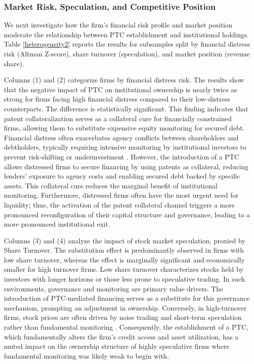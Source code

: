 \documentclass[12pt,a4paper]{article}
\begin{document}
\subsubsection{Market Risk, Speculation, and Competitive Position}
We next investigate how the firm's financial risk profile and market position moderate the relationship between PTC establishment and institutional holdings. Table \ref{heterogeneity2} reports the results for subsamples split by financial distress risk (Altman Z-score), share turnover (speculation), and market position (revenue share).

Columns (1) and (2) categorize firms by financial distress risk. The results show that the negative impact of PTC on institutional ownership is nearly twice as strong for firms facing high financial distress compared to their low-distress counterparts. The difference is statistically significant. This finding indicates that patent collateralization serves as a collateral cure for financially constrained firms, allowing them to substitute expensive equity monitoring for secured debt. Financial distress often exacerbates agency conflicts between shareholders and debtholders, typically requiring intensive monitoring by institutional investors to prevent risk-shifting or underinvestment \citep{childs2005interactions,pawlina2010underinvestm,pryshchepa2013can}. However, the introduction of a PTC allows distressed firms to secure financing by using patents as collateral, reducing lenders' exposure to agency costs and enabling secured debt backed by specific assets. This collateral cure reduces the marginal benefit of institutional monitoring. Furthermore, distressed firms often have the most urgent need for liquidity; thus, the activation of the patent collateral channel triggers a more pronounced reconfiguration of their capital structure and governance, leading to a more pronounced institutional exit.

Columns (3) and (4) analyze the impact of stock market speculation, proxied by Share Turnover. The substitution effect is predominantly observed in firms with low share turnover, whereas the effect is marginally significant and economically smaller for high turnover firms. Low share turnover characterizes stocks held by investors with longer horizons or those less prone to speculative trading. In such environments, governance and monitoring are primary value drivers. The introduction of PTC-mediated financing serves as a substitute for this governance mechanism, prompting an adjustment in ownership. Conversely, in high-turnover firms, stock prices are often driven by noise trading and short-term speculation rather than fundamental monitoring \citep{goldstein2013trading}. Consequently, the establishment of a PTC, which fundamentally alters the firm's credit access and asset utilization, has a muted impact on the ownership structure of highly speculative firms where fundamental monitoring was likely weak to begin with.
\end{document}
